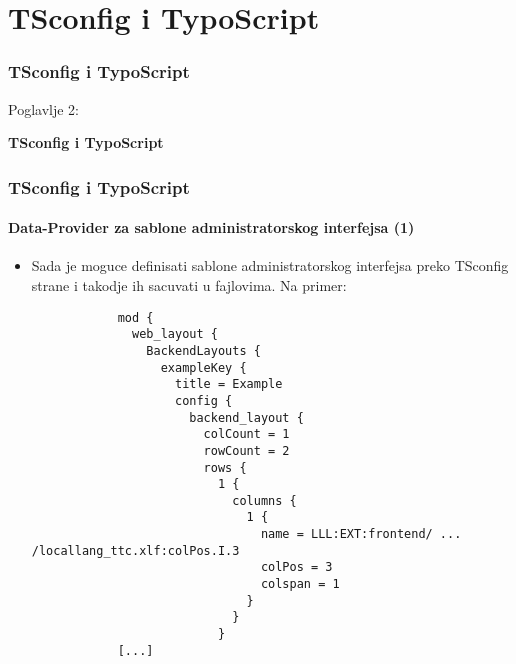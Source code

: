 %

\section{TSconfig i TypoScript}
\begin{frame}[fragile]
	\frametitle{TSconfig i TypoScript}

	\begin{center}\huge{Poglavlje 2:}\end{center}
	\begin{center}\huge{\color{typo3darkgrey}\textbf{TSconfig i TypoScript}}\end{center}

\end{frame}

\begin{frame}[fragile]
	\frametitle{TSconfig i TypoScript}
	\framesubtitle{Data-Provider za sablone administratorskog interfejsa (1)}

	\lstset{basicstyle=\tiny\ttfamily}

	\begin{itemize}
		\item Sada je moguce definisati sablone administratorskog interfejsa preko TSconfig strane i takodje ih sacuvati u fajlovima. Na primer:

		\begin{lstlisting}
			mod {
			  web_layout {
			    BackendLayouts {
			      exampleKey {
			        title = Example
			        config {
			          backend_layout {
			            colCount = 1
			            rowCount = 2
			            rows {
			              1 {
			                columns {
			                  1 {
			                    name = LLL:EXT:frontend/ ... /locallang_ttc.xlf:colPos.I.3
			                    colPos = 3
			                    colspan = 1
			                  }
			                }
			              }
			[...]
		\end{lstlisting}

	\end{itemize}

\end{frame}

